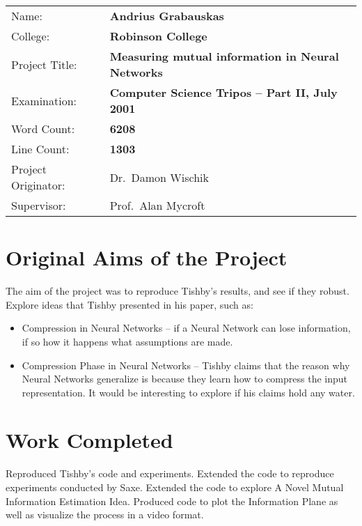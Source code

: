 \documentclass[dissertation.tex]{subfiles}
\begin{document}
{\large
\begin{tabular}{ll}
Name:               & \bf Andrius Grabauskas                    \\
College:            & \bf Robinson College                      \\
Project Title:      & \bf Measuring mutual information in Neural Networks \\
Examination:        & \bf Computer Science Tripos -- Part II, July 2001  \\
Word Count:         & \bf 6208\footnotemark[1] \\
Line Count:         & \bf 1303\footnotemark[2] \\
Project Originator: & Dr.\ Damon Wischik                  \\
Supervisor:         & Prof.\ Alan Mycroft                 \\ 
\end{tabular}
}


\section*{Original Aims of the Project}

The aim of the project was to reproduce Tishby's results, and see if they
robust. Explore ideas that Tishby presented in his paper, such as: 
\begin{itemize}
  \item{
      Compression in Neural Networks -- if a Neural Network can lose
      information, if so how it happens what assumptions are made.
    }
  \item{
      Compression Phase in Neural Networks -- Tishby claims that the reason why
      Neural Networks generalize is because they learn how to compress the input
      representation. It would be interesting to explore if his claims hold any
      water.
    }
\end{itemize}

\section*{Work Completed}

Reproduced Tishby's code and experiments. Extended the code to reproduce
experiments conducted by Saxe. Extended the code to explore A Novel Mutual
Information Estimation Idea. Produced code to plot the Information Plane as well
as visualize the process in a video format.
\end{document}
